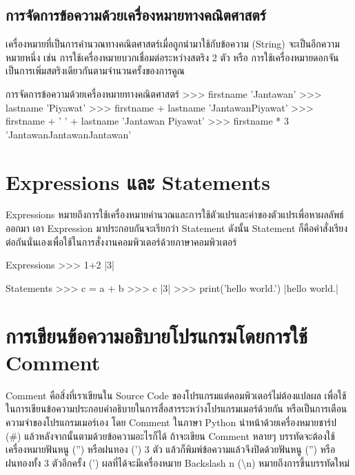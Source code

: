 \subsection{การจัดการข้อความด้วยเครื่องหมายทางคณิตศาสตร์}

เครื่องหมายที่เป็นการคำนวณทางคณิตศาสตร์เมื่อถูกนำมาใช้กับข้อความ (String) จะเป็นอีกความหมายหนึ่ง เช่น การใช้เครื่องหมายบวกเชื่อมต่อระหว่างสตริง 2 ตัว หรือ การใช้เครื่องหมายดอกจันเป็นการเพิ่มสตริงเดียวกันตามจำนวนครั้งของการคูณ

\begin{codelist}{การจัดการข้อความด้วยเครื่องหมายทางคณิตศาสตร์}{}
>>> firstname
'Jantawan'
>>> lastname
'Piyawat'
>>> firstname + lastname
'JantawanPiyawat'
>>> firstname + '  ' + lastname
'Jantawan Piyawat'
>>> firstname * 3
'JantawanJantawanJantawan'
\end{codelist}


\section{Expressions และ Statements}

Expressions หมายถึงการใช้เครื่องหมายคำนวณและการใช้ตัวแปรและค่าของตัวแปรเพื่อหาผลลัพธ์ออกมา เอา Expression มาประกอบกันจะเรียกว่า Statement ดังนั้น Statement ก็คือคำสั่งเรียงต่อกันนั่นเองเพื่อใช้ในการสั่งงานคอมพิวเตอร์ด้วยภาษาคอมพิวเตอร์

\begin{codelist}{Expressions}{}
>>> 1+2
|3|
\end{codelist}

\begin{codelist}{Statements}{}
>>> c = a + b
>>> c
|3|
>>> print('hello world.')
|hello world.|

\end{codelist}


\section{การเขียนข้อความอธิบายโปรแกรมโดยการใช้ Comment}

Comment คือสิ่งที่เราเขียนใน Source Code ของโปรแกรมแต่คอมพิวเตอร์ไม่ต้องแปลผล เพื่อใช้ในการเขียนข้อความประกอบคำอธิบายในการสื่อสารระหว่างโปรแกรมเมอร์ด้วยกัน หรือเป็นการเตือนความจำของโปรแกรมเมอร์เอง โดย Comment ในภาษา Python นำหน้าด้วยเครื่องหมายชาร์ป (\#) แล้วหลังจากนั้นตามด้วยข้อความอะไรก็ได้ ถ้าจะเขียน Comment หลายๆ บรรทัดจะต้องใช้เครื่องหมายฟันหนู ('') หรือฝนทอง (')  3 ตัว แล้วก็พิมพ์ข้อความแล้วจึงปิดด้วยฟันหนู ('') หรือฝนทองทั้ง 3 ตัวอีกครั้ง (') ผลที่ได้จะมีเครื่องหมาย Backslash n (\textbackslash n) หมายถึงการขึ้นบรรทัดใหม่

